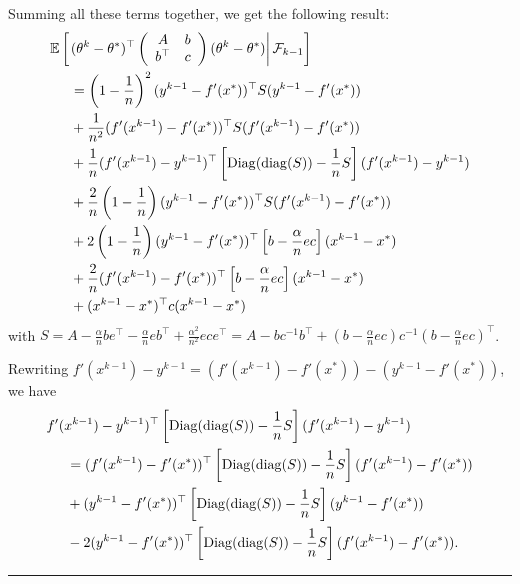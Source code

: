 \documentclass{article}
\newcommand{\diag}{\mathop{\rm diag}}
\newcommand{\Diag}{\mathop{\rm Diag}}
\newcommand{\BlackBox}{\rule{1.5ex}{1.5ex}}  %
\newenvironment{proof}{\par\noindent{\bf Proof\ }}{\hfill\BlackBox\\[2mm]}
\def\diag{\operatorname{diag}}
\def\E{_{\scriptscriptstyle E}}
\def \E{{\mathbb E}}
\def \E{{\mathbb E}}
\begin{document}
\begin{proof}
Summing all these terms together, we get the following result:
\begin{align*}
&\E\left[\left.(\theta^k - \theta^*)^\top \left(\begin{array}{cc} A & b \\ b^\top & c
\end{array}\right) (\theta^k - \theta^*)\right| \mathcal{F}_{k-1}\right] \nonumber\\
&\hspace*{.5cm}=\left(1 - \frac{1}{n}\right)^2 (y^{k-1} - f'(x^\ast))^\top S(y^{k-1} - f'(x^\ast))\\
&\hspace*{.5cm}+ \frac{1}{n^2}(f'(x^{k-1}) - f'(x^\ast))^\top S(f'(x^{k-1}) - f'(x^\ast))\\
&\hspace*{.5cm}+ \frac{1}{n}(f'(x^{k-1}) - y^{k-1})^\top\left[\Diag(\diag(S)) - \frac{1}{n}S\right](f'(x^{k-1}) - y^{k-1})\\
&\hspace*{.5cm}+ \frac{2}{n}\left(1 - \frac{1}{n}\right)(y^{k-1} - f'(x^\ast))^\top S (f'(x^{k-1}) - f'(x^\ast))\\
&\hspace*{.5cm}+ 2\left(1 - \frac{1}{n}\right) (y^{k-1} - f'(x^\ast))^\top \left[b - \frac{\alpha}{n}ec\right](x^{k-1} - x^\ast)\\
&\hspace*{.5cm}+ \frac{2}{n}(f'(x^{k-1}) - f'(x^\ast))^\top\left[b - \frac{\alpha}{n}ec\right](x^{k-1} - x^\ast)\\
&\hspace*{.5cm}+ (x^{k-1} - x^\ast)^\top c (x^{k-1} - x^\ast)
\end{align*}
with $S = A - \frac{\alpha}{n} b e^\top - \frac{\alpha}{n} e b^\top + \frac{\alpha^2}{n^2} e ce^\top
= A - b c^{-1} b^\top + (b - \frac{\alpha}{n} e c ) c^{-1} (b - \frac{\alpha}{n} e c )^\top
$.

Rewriting $f'(x^{k-1}) - y^{k-1} = (f'(x^{k-1}) - f'(x^\ast)) - (y^{k-1} - f'(x^\ast))$, we have
\begin{align*}
&f'(x^{k-1}) - y^{k-1})^\top\left[\Diag(\diag(S)) - \frac{1}{n}S\right](f'(x^{k-1}) - y^{k-1})\\
&\hspace*{.5cm} = (f'(x^{k-1}) - f'(x^\ast))^\top\left[\Diag(\diag(S)) - \frac{1}{n}S\right](f'(x^{k-1}) - f'(x^\ast))\\
&\hspace*{.5cm} + (y^{k-1} - f'(x^\ast))^\top\left[\Diag(\diag(S)) - \frac{1}{n}S\right](y^{k-1} - f'(x^\ast))\\
&\hspace*{.5cm} - 2(y^{k-1} - f'(x^\ast))^\top\left[\Diag(\diag(S)) - \frac{1}{n}S\right](f'(x^{k-1}) - f'(x^\ast)).
\end{align*}


\end{proof}
\end{document}
